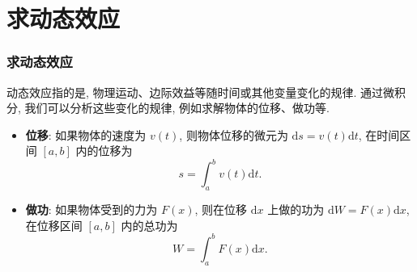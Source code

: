 
\section{求动态效应}


\begin{frame}
\frametitle{求动态效应}

动态效应指的是, 物理运动、边际效益等随时间或其他变量变化的规律. 通过微积分, 我们可以分析这些变化的规律, 例如求解物体的位移、做功等.

\begin{itemize}[<+->]
\item \textbf{位移}: 如果物体的速度为 $v(t)$, 则物体位移的微元为 $\mathrm{d}s = v(t) \mathrm{d}t$, 在时间区间 $[a,b]$ 内的位移为
\[
s = \int_a^b v(t) \mathrm{d}t.
\]
\item \textbf{做功}: 如果物体受到的力为 $F(x)$, 则在位移 $\mathrm{d}x$ 上做的功为 $\mathrm{d}W = F(x) \mathrm{d}x$, 在位移区间 $[a,b]$ 内的总功为
\[
W = \int_a^b F(x) \mathrm{d}x.
\]
\end{itemize}

\end{frame}



